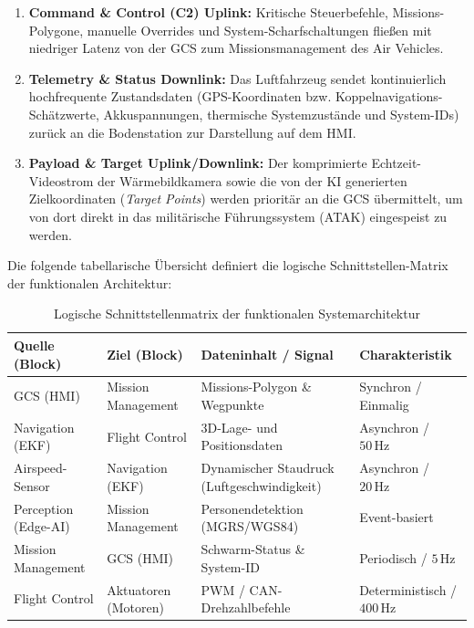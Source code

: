 \begin{enumerate}
    \item \textbf{Command \& Control (C2) Uplink:} Kritische Steuerbefehle, Missions-Polygone, manuelle Overrides und System-Scharfschaltungen fließen mit niedriger Latenz von der GCS zum Missionsmanagement des Air Vehicles.
    \item \textbf{Telemetry \& Status Downlink:} Das Luftfahrzeug sendet kontinuierlich hochfrequente Zustandsdaten (GPS-Koordinaten bzw. Koppelnavigations-Schätzwerte, Akkuspannungen, thermische Systemzustände und System-IDs) 
                                                 zurück an die Bodenstation zur Darstellung auf dem HMI.
    \item \textbf{Payload \& Target Uplink/Downlink:} Der komprimierte Echtzeit-Videostrom der Wärmebildkamera sowie die von der KI generierten Zielkoordinaten (\textit{Target Points}) 
                                                      werden prioritär an die GCS übermittelt, um von dort direkt in das militärische Führungssystem (ATAK) eingespeist zu werden.
\end{enumerate}

Die folgende tabellarische Übersicht definiert die logische Schnittstellen-Matrix der funktionalen Architektur:

\begin{table}[h!]
    \centering
    \caption{Logische Schnittstellenmatrix der funktionalen Systemarchitektur}
    \vspace{0.2cm}
    \begin{tabular}{p{3.5cm} p{3.5cm} p{4.0cm} p{3.0cm}}
        \toprule
        \textbf{Quelle (Block)} & \textbf{Ziel (Block)} & \textbf{Dateninhalt / Signal} & \textbf{Charakteristik} \\
        \midrule
        GCS (HMI) & Mission Management & Missions-Polygon \& Wegpunkte & Synchron / Einmalig \\
        Navigation (EKF) & Flight Control & $3\text{D}$-Lage- und Positionsdaten & Asynchron / $50\,\text{Hz}$ \\
        Airspeed-Sensor & Navigation (EKF) & Dynamischer Staudruck (Luftgeschwindigkeit) & Asynchron / $20\,\text{Hz}$ \\
        Perception (Edge-AI) & Mission Management & Personendetektion (MGRS/WGS84) & Event-basiert \\
        Mission Management & GCS (HMI) & Schwarm-Status \& System-ID & Periodisch / $5\,\text{Hz}$ \\
        Flight Control & Aktuatoren (Motoren) & PWM / CAN-Drehzahlbefehle & Deterministisch / $400\,\text{Hz}$ \\
        \bottomrule
    \end{tabular}
    \label{tab:functional_interfaces}
\end{table}

